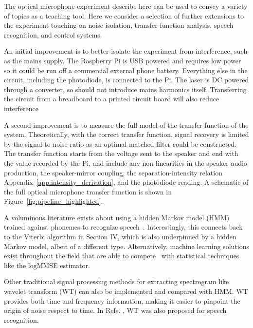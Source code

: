 \documentclass[paper-main.tex]{subfiles}
\begin{document}

The optical microphone experiment describe here can be used to convey a variety of topics as a teaching tool. 
Here we consider a selection of further extensions to the experiment touching on noise isolation, transfer function analysis, speech recognition, and control systems. 


An initial improvement is to better isolate the experiment from interference, such as the mains supply. 
The Raspberry Pi is USB powered and requires low power so it could be run off a commercial external phone battery. 
Everything else in the circuit, including the photodiode, is connected to the Pi. 
The laser is DC powered through a converter, so should not introduce mains harmonics itself. 
Transferring the circuit from a breadboard to a printed circuit board will also reduce interference~\cite{elfekey2013design}


A second improvement is to measure the full model of the transfer function of the system. 
Theoretically, with the correct transfer function, signal recovery is limited by the signal-to-noise ratio as an optimal matched filter could be constructed.
The transfer function starts from the voltage sent to the speaker and end with the value recorded by the Pi, and include any non-linearities in the speaker audio production, the speaker-mirror coupling, the separation-intensity relation Appendix~\ref{app:intensity_derivation}, and the photodiode reading. 
A schematic of the full optical microphone transfer function is shown in Figure~\ref{fig:pipeline_highlighted}.

A voluminous literature exists about using a hidden Markov model (HMM) trained against phonemes to recognize speech~\cite{HMM_english}. 
Interestingly, this connects back to the Viterbi algorithm in Section IV, which is also underpinned by a hidden Markov model, albeit of a different type. 
Alternatively, machine learning solutions exist throughout the field that are able to compete~\cite{SEGAN} with statistical techniques like the logMMSE estimator.

Other traditional signal processing methods for extracting spectrogram like wavelet transform (WT) \citep{nason1995stationary} can also be implemented and compared with HMM. WT provides both time and frequency information, making it easier to pinpoint the origin of noise respect to time. 
In Refs. \cite{tufekci2000feature,agbinya1996discrete}, WT was also proposed for speech recognition. 
\end{document}
